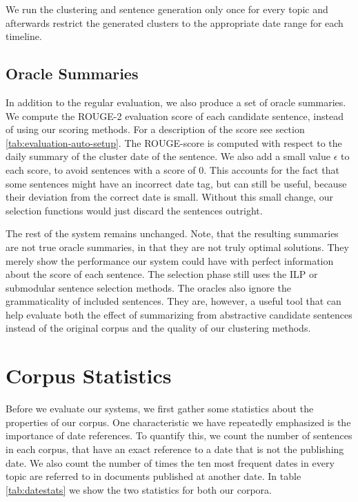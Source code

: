 \documentclass[a4paper,BCOR=10mm]{report}
\numberwithin{lemma}{chapter}
\numberwithin{definition}{chapter}
\begin{document}
We run the clustering and sentence generation only once for every topic and afterwards restrict the generated clusters to the appropriate date range for each timeline.

\subsection{Oracle Summaries}

In addition to the regular evaluation, we also produce a set of oracle summaries. We compute the ROUGE-2 evaluation score of each candidate sentence, instead of using our scoring methods. For a description of the score see section \ref{tab:evaluation-auto-setup}. The ROUGE-score is computed with respect to the daily summary of the cluster date of the sentence. We also add a small value $\epsilon$ to each score, to avoid sentences with a score of 0. This accounts for the fact that some sentences might have an incorrect date tag, but can still be useful, because their deviation from the correct date is small. Without this small change, our selection functions would just discard the sentences outright.

The rest of the system remains unchanged. Note, that the resulting summaries are not true oracle summaries, in that they are not truly optimal solutions. They merely show the performance our system could have with perfect information about the score of each sentence. The selection phase still uses the ILP or submodular sentence selection methods. The oracles also ignore the grammaticality of included sentences. They are, however, a useful tool that can help evaluate both the effect of summarizing from abstractive candidate sentences instead of the original corpus and the quality of our clustering methods.



\section{Corpus Statistics} \label{sec:setup-stats}

Before we evaluate our systems, we first gather some statistics about the properties of our corpus.
One characteristic we have repeatedly emphasized is the importance of date references.
To quantify this, we count the number of sentences in each corpus, that have an exact reference to a date that is not the publishing date.
We also count the number of times the ten most frequent dates in every topic are referred to in documents published at another date.
In table \ref{tab:datestats} we show the two statistics for both our corpora.
\end{document}
